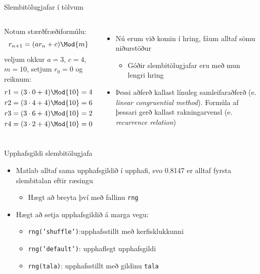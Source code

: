 \documentclass{beamer}
\begin{document}
\begin{frame}{Slembitölugjafar í tölvum}
\begin{columns}
Notum stærðfræðiformúlu:
\[
r_{n+1} = (ar_n + c) \Mod{m}
\]
veljum okkur $a=3$, $c=4$, $m=10$, setjum $r_0 = 0$ og reiknum:
\begin{align*}
r1 = (3 \cdot 0 + 4) \Mod{10}  &=  4\\
r2 = (3 \cdot 4 + 4) \Mod{10}  &=  6\\
r3 = (3 \cdot 6 + 4) \Mod{10}  &=  2\\
r4 = (3 \cdot 2 + 4) \Mod{10}  &=  0\\
\end{align*}
\begin{itemize}
\item Nú erum við komin í hring, fáum alltaf sömu niðurstöður
 \begin{itemize}
  \item Góðir slembitölugjafar eru með mun lengri hring
 \end{itemize}
 \item Þessi aðferð kallast línuleg samleifaraðferð (e. \emph{linear congruential method}). Formúla af þessari gerð kallast rakningarvensl (e. \emph{recurrence relation})
\end{itemize}
\end{columns}
\end{frame}

\begin{frame}{Upphafsgildi slembitölugjafa}
\begin{itemize}
 \item Matlab alltaf sama upphafsgildið í upphafi, svo 0.8147 er alltaf fyrsta slembitalan eftir ræsingu
 \begin{itemize}
  \item Hægt að breyta því með fallinu \texttt{rng}
 \end{itemize}
 \item Hægt að setja upphafsgildið á marga vegu:
 \begin{itemize}
  \item \texttt{rng('shuffle')}:upphafsstillt með kerfisklukkunni
  \item \texttt{rng('default')}: upphaflegt upphafsgildi
  \item \texttt{rng(tala)}: upphafsstillt með gildinu \texttt{tala}
 \end{itemize}
\end{itemize}
\end{frame}
\end{document}
